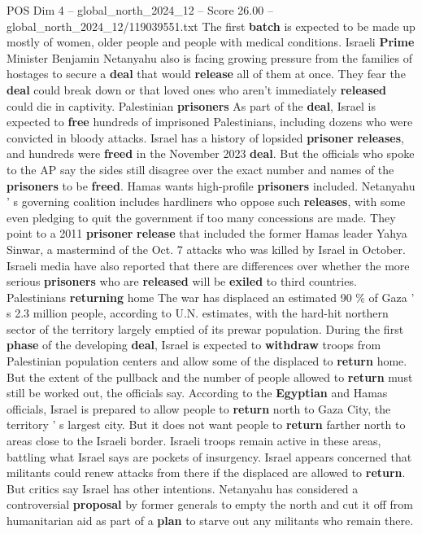 \begin{textsample}{POS Dim 4 – global\_north\_2024\_12 – Score 26.00 – global\_north\_2024\_12/119039551.txt}
The first \textbf{batch} is expected to be made up mostly of women, older people and people with medical conditions.
Israeli \textbf{Prime} Minister Benjamin Netanyahu also is facing growing pressure from the families of hostages to secure a \textbf{deal} that would \textbf{release} all of them at once.
They fear the \textbf{deal} could break down or that loved ones who aren't immediately \textbf{released} could die in captivity.
Palestinian \textbf{prisoners} As part of the \textbf{deal}, Israel is expected to \textbf{free} hundreds of imprisoned Palestinians, including dozens who were convicted in bloody attacks.
Israel has a history of lopsided \textbf{prisoner} \textbf{releases}, and hundreds were \textbf{freed} in the November 2023 \textbf{deal}.
But the officials who spoke to the AP say the sides still disagree over the exact number and names of the \textbf{prisoners} to be \textbf{freed}.
Hamas wants high-profile \textbf{prisoners} included.
Netanyahu ' s governing coalition includes hardliners who oppose such \textbf{releases}, with some even pledging to quit the government if too many concessions are made.
They point to a 2011 \textbf{prisoner} \textbf{release} that included the former Hamas leader Yahya Sinwar, a mastermind of the Oct. 7 attacks who was killed by Israel in October.
Israeli media have also reported that there are differences over whether the more serious \textbf{prisoners} who are \textbf{released} will be \textbf{exiled} to third countries.
Palestinians \textbf{returning} home The war has displaced an estimated 90 \% of Gaza ' s 2.3 million people, according to U.N. estimates, with the hard-hit northern sector of the territory largely emptied of its prewar population.
During the first \textbf{phase} of the developing \textbf{deal}, Israel is expected to \textbf{withdraw} troops from Palestinian population centers and allow some of the displaced to \textbf{return} home.
But the extent of the pullback and the number of people allowed to \textbf{return} must still be worked out, the officials say.
According to the \textbf{Egyptian} and Hamas officials, Israel is prepared to allow people to \textbf{return} north to Gaza City, the territory ' s largest city.
But it does not want people to \textbf{return} farther north to areas close to the Israeli border.
Israeli troops remain active in these areas, battling what Israel says are pockets of insurgency.
Israel appears concerned that militants could renew attacks from there if the displaced are allowed to \textbf{return}.
But critics say Israel has other intentions.
Netanyahu has considered a controversial \textbf{proposal} by former generals to empty the north and cut it off from humanitarian aid as part of a \textbf{plan} to starve out any militants who remain there.

\end{textsample}
